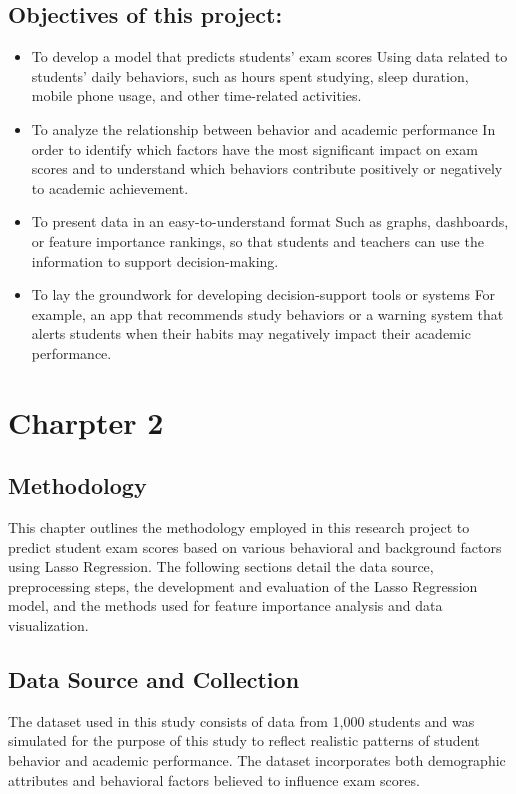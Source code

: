\documentclass[a4paper,12pt]{article}
\begin{document}
	\subsection{Objectives of this project:}
	\begin{itemize}
		\item To develop a model that predicts students’ exam scores
		Using data related to students’ daily behaviors, such as hours spent studying, sleep duration, mobile phone usage, and other time-related activities.
		\item To analyze the relationship between behavior and academic performance
		In order to identify which factors have the most significant impact on exam scores and to understand which behaviors contribute positively or negatively to academic achievement.
		\item To present data in an easy-to-understand format
		Such as graphs, dashboards, or feature importance rankings, so that students and teachers can use the information to support decision-making.
		\item To lay the groundwork for developing decision-support tools or systems
		For example, an app that recommends study behaviors or a warning system that alerts students when their habits may negatively impact their academic performance.
	\end{itemize}
	
	
\section{Charpter 2}
	\subsection{Methodology}
	This chapter outlines the methodology employed in this research project to predict student exam scores based on various behavioral and background factors using Lasso Regression. The following sections detail the data source, preprocessing steps, the development and evaluation of the Lasso Regression model, and the methods used for feature importance analysis and data visualization.

	\subsection{Data Source and Collection}
	The dataset used in this study consists of data from 1,000 students and was simulated for the purpose of this study to reflect realistic patterns of student behavior and academic performance. The dataset incorporates both demographic attributes and behavioral factors believed to influence exam scores.
	
\end{document}
